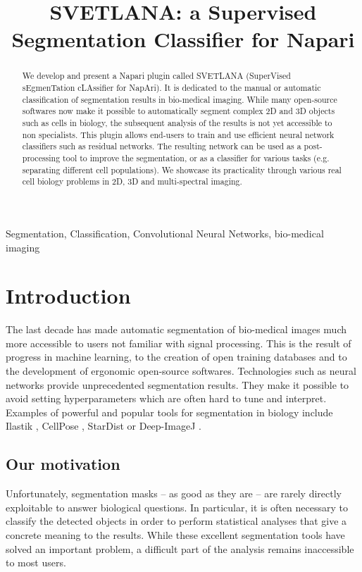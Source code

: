 \documentclass{article}
\title{SVETLANA: a Supervised Segmentation Classifier for Napari}
\begin{document}
%
\maketitle
%
\begin{abstract}
We develop and present a Napari plugin called SVETLANA (SuperVised sEgmenTation cLAssifier for NapAri). It is dedicated to the manual or automatic classification of segmentation results in bio-medical imaging.
While many open-source softwares now make it possible to automatically segment complex 2D and 3D objects such as cells in biology, the subsequent analysis of the results is not yet accessible to non specialists. 
This plugin allows end-users to train and use efficient neural network classifiers such as residual networks. 
The resulting network can be used as a post-processing tool to improve the segmentation, or as a classifier for various tasks (e.g. separating different cell populations).
We showcase its practicality through various real cell biology problems in 2D, 3D and multi-spectral imaging.
\end{abstract}
%
\begin{keywords}
Segmentation, Classification, Convolutional Neural Networks, bio-medical imaging
\end{keywords}
%
\section{Introduction}
\label{sec:intro}

The last decade has made automatic segmentation of bio-medical images much more accessible to users not familiar with signal processing. 
This is the result of progress in machine learning, to the creation of open training databases and to the development of ergonomic open-source softwares. Technologies such as neural networks provide unprecedented segmentation results. They make it possible to avoid setting hyperparameters which are often hard to tune and interpret. 
Examples of powerful and popular tools for segmentation in biology include Ilastik \cite{berg2019ilastik}, CellPose \cite{stringer2021cellpose}, StarDist \cite{fazeli2020automated} or Deep-ImageJ \cite{gomez2021deepimagej}. 

\subsection{Our motivation}

Unfortunately, segmentation masks -- as good as they are -- are rarely directly exploitable to answer biological questions. In particular, it is often necessary to classify the detected objects in order to perform statistical analyses that give a concrete meaning to the results. 
While these excellent segmentation tools have solved an important problem, a difficult part of the analysis remains inaccessible to most users.
\end{document}
